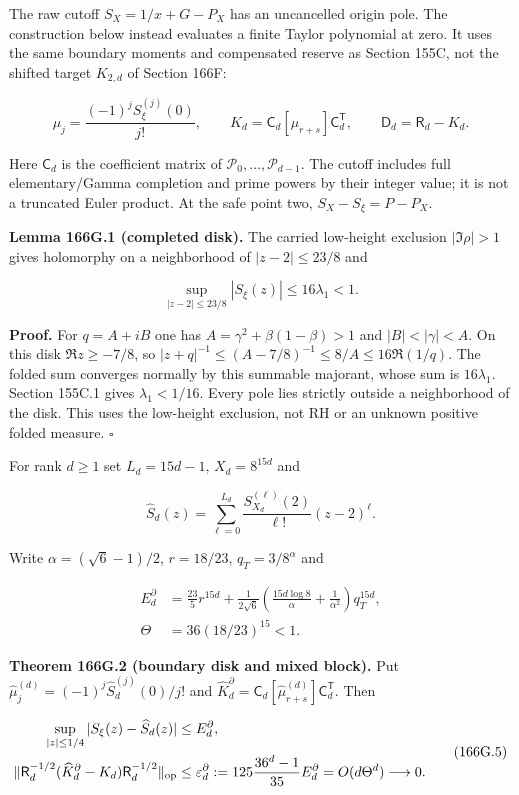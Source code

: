 \documentclass[
  11pt,
]{book}
\begin{document}
The raw cutoff \(S_X=1/x+G-P_X\) has an uncancelled origin pole. The
construction below instead evaluates a finite Taylor polynomial at zero.
It uses the same boundary moments and compensated reserve as Section
155C, not the shifted target \(K_{2,d}\) of Section 166F:

\[
\mu_j=\frac{(-1)^jS_\xi^{(j)}(0)}{j!},\qquad
K_d=\mathsf C_d[\mu_{r+s}]\mathsf C_d^{\mathsf T},\qquad
\mathsf D_d=\mathsf R_d-K_d.
\tag{166G.1}
\]

Here \(\mathsf C_d\) is the coefficient matrix of \(\mathcal P_0,\ldots,
\mathcal P_{d-1}\). The cutoff includes full elementary/Gamma completion
and prime powers by their integer value; it is not a truncated Euler
product. At the safe point two, \(S_X-S_\xi=P-P_X\).

\textbf{Lemma 166G.1 (completed disk).} The carried low-height exclusion
\(|\Im\rho|>1\) gives holomorphy on a neighborhood of \(|z-2|\le23/8\)
and

\[
\sup_{|z-2|\le23/8}|S_\xi(z)|\le16\lambda_1<1.
\tag{166G.2}
\]

\textbf{Proof.} For \(q=A+iB\) one has \(A=\gamma^2+\beta(1-\beta)>1\)
and \(|B|<|\gamma|<A\). On this disk \(\Re z\ge-7/8\), so
\(|z+q|^{-1}\le(A-7/8)^{-1}\le8/A\le16\Re(1/q)\). The folded sum
converges normally by this summable majorant, whose sum is
\(16\lambda_1\). Section 155C.1 gives \(\lambda_1<1/16\). Every pole
lies strictly outside a neighborhood of the disk. This uses the
low-height exclusion, not RH or an unknown positive folded measure.
\(\square\)

For rank \(d\ge1\) set \(L_d=15d-1\), \(X_d=8^{15d}\) and

\[
\boxed{\widehat S_d(z)=\sum_{\ell=0}^{L_d}
\frac{S_{X_d}^{(\ell)}(2)}{\ell!}(z-2)^\ell.}
\tag{166G.3}
\]

Write \(\alpha=(\sqrt6-1)/2\), \(r=18/23\), \(q_T=3/8^\alpha\) and

\[
\begin{aligned}
E_d^\partial&=\frac{23}{5}r^{15d}
 +\frac1{2\sqrt6}\left(\frac{15d\log8}{\alpha}+\frac1{\alpha^2}\right)q_T^{15d},\\
\Theta&=36(18/23)^{15}<1.
\end{aligned}
\tag{166G.4}
\]

\textbf{Theorem 166G.2 (boundary disk and mixed block).} Put
\(\widehat\mu_j^{(d)}=(-1)^j\widehat S_d^{(j)}(0)/j!\) and
\(\widehat K_d^\partial=\mathsf C_d[\widehat\mu_{r+s}^{(d)}]
\mathsf C_d^{\mathsf T}\). Then

\[
\begin{aligned}
\sup_{|z|\le1/4}|S_\xi(z)-\widehat S_d(z)|&\le E_d^\partial,\\
\|\mathsf R_d^{-1/2}(\widehat K_d^\partial-K_d)
\mathsf R_d^{-1/2}\|_{\rm op}
&\le\varepsilon_d^\partial:=125\frac{36^d-1}{35}E_d^\partial
 =O(d\Theta^d)\longrightarrow0.
\end{aligned}
\tag{166G.5}
\]
\end{document}
